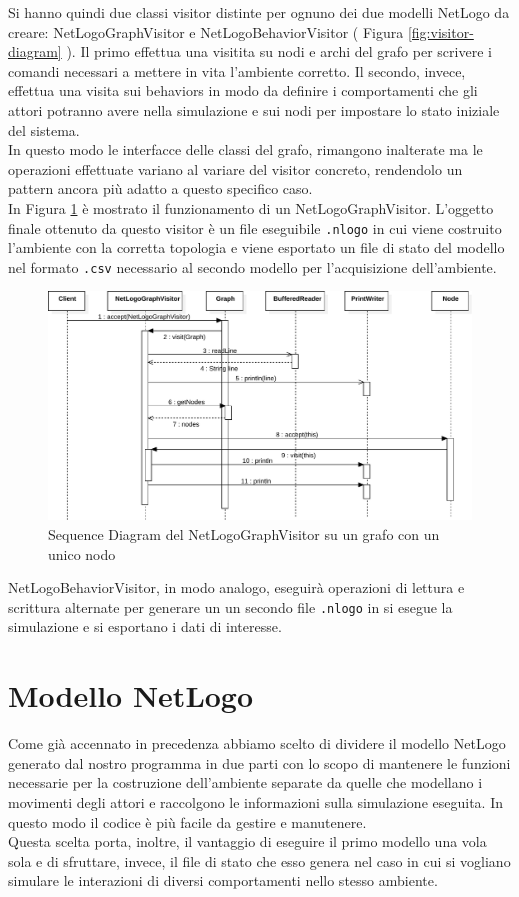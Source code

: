 Si hanno quindi due classi visitor distinte per ognuno dei due modelli NetLogo da creare: NetLogoGraphVisitor e NetLogoBehaviorVisitor ( Figura \ref{fig:visitor-diagram} ). Il primo effettua una visitita su nodi e archi del grafo per scrivere i comandi necessari a mettere in vita l'ambiente corretto. Il secondo, invece, effettua una visita sui behaviors in modo da definire i comportamenti che gli attori potranno avere nella simulazione e sui nodi per impostare lo stato iniziale del sistema.\\
In questo modo le interfacce delle classi del grafo, rimangono inalterate ma le operazioni effettuate variano al variare del visitor concreto, rendendolo un pattern ancora più adatto a questo specifico caso.\\
In Figura \ref{fig:visitor-sequence} è mostrato il funzionamento di un NetLogoGraphVisitor. L'oggetto finale ottenuto da questo visitor è un file eseguibile \texttt{.nlogo} in cui viene costruito l'ambiente con la corretta topologia e viene esportato un file di stato del modello nel formato \texttt{.csv} necessario al secondo modello per l'acquisizione dell'ambiente.\\
\begin{figure}[htbp]
\centering
\includegraphics[width=\textwidth,height=\textheight,keepaspectratio]{images/visitor-sequence.pdf}
\caption{Sequence Diagram del NetLogoGraphVisitor su un grafo con un unico nodo}
\label{fig:visitor-sequence}
\end{figure}
NetLogoBehaviorVisitor, in modo analogo, eseguirà operazioni di lettura e scrittura alternate per generare un un secondo file \texttt{.nlogo} in si esegue la simulazione e si esportano i dati di interesse.

\section{Modello NetLogo}
Come già accennato in precedenza abbiamo scelto di dividere il modello NetLogo generato dal nostro programma in due parti con lo scopo di mantenere le funzioni necessarie per la costruzione dell'ambiente separate da quelle che modellano i movimenti degli attori e raccolgono le informazioni sulla simulazione eseguita. In questo modo il codice è più facile da gestire e manutenere.\\
Questa scelta porta, inoltre, il vantaggio di eseguire il primo modello una vola sola e di sfruttare, invece, il file di stato che esso genera nel caso in cui si vogliano simulare le interazioni di diversi comportamenti nello stesso ambiente.
